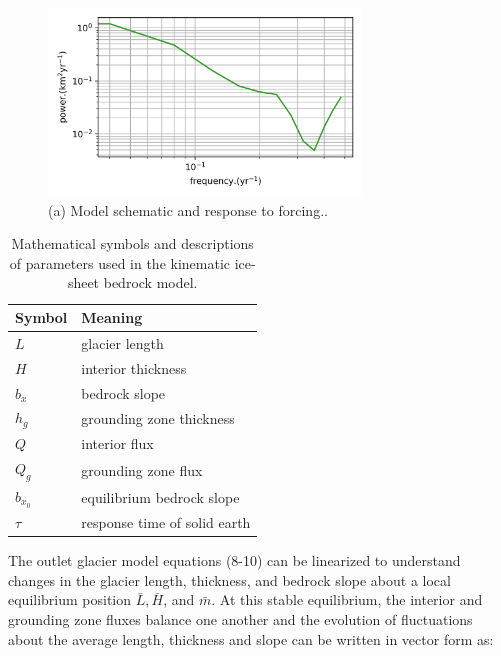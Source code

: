 \documentclass[tc, manuscript]{copernicus}
\begin{document}
\begin{figure}[t]
\includegraphics[width=8.3cm]{../figures/simulation0203.png}
\caption{(a) Model schematic and response to forcing..}
\end{figure}


\begin{table}[h]
    \begin{tabular}{l|l}
        Symbol & Meaning \\
        \hline
        $L$ & glacier length \\
        $H$ & interior thickness \\
        $b_x$ & bedrock slope \\
        $h_g$ & grounding zone thickness \\
        $Q$ & interior flux \\
        $Q_g$ & grounding zone flux \\
        $b_{x_0}$ & equilibrium bedrock slope \\
        $\tau$ & response time of solid earth  \\
    \end{tabular}
    \caption{Mathematical symbols and descriptions of parameters used in the kinematic ice-sheet bedrock model.}
\end{table}

The outlet glacier model equations (8-10)  can be linearized to understand changes in the glacier length, thickness, and bedrock slope about a local equilibrium position $\bar{L}, \bar{H}$, and $\bar{m}$. At this stable equilibrium, the interior and grounding zone fluxes balance one another and the evolution of fluctuations about the average length, thickness and slope can be written in vector form as:
\end{document}
